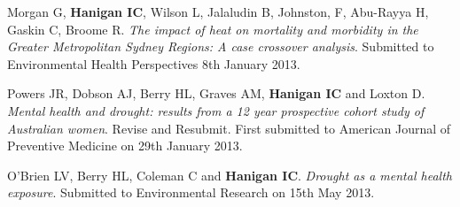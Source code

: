 \documentclass[a4paper,11pt]{article}
\begin{document}
\medskip
\renewcommand{\labelenumi}{\textsc{b}\theenumi.}
\begin{revnumerate}
\item Morgan G, \textbf{Hanigan IC}, Wilson L, Jalaludin B, Johnston, F, Abu-Rayya H, Gaskin C, Broome R. \emph{The impact of heat on mortality and morbidity in the Greater Metropolitan Sydney Regions: A case crossover analysis}.  Submitted to Environmental Health Perspectives 8th January 2013.

\item Powers JR, Dobson AJ, Berry HL, Graves AM, \textbf{Hanigan IC} and Loxton D. \emph{Mental health and drought: results from a 12 year prospective cohort study of Australian women}. Revise and Resubmit. First submitted to American Journal of Preventive Medicine on 29th January 2013. 

\item O'Brien LV, Berry HL, Coleman C and \textbf{Hanigan IC}. \emph{Drought as a mental health exposure}.  Submitted to Environmental Research on 15th May 2013. 

\end{revnumerate}
\end{document}
